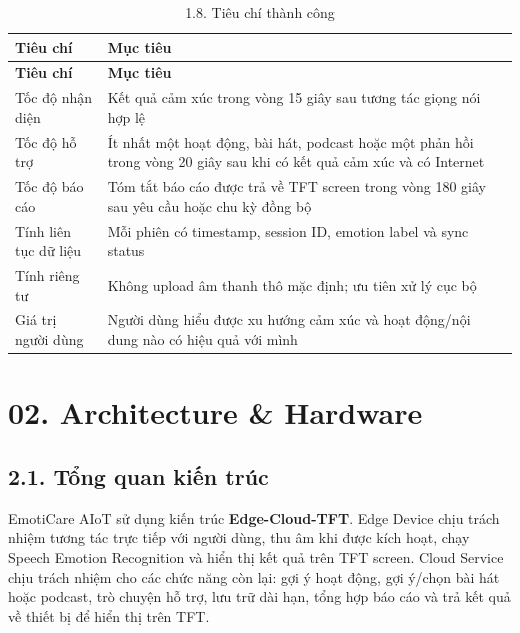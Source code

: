 \documentclass[12pt,a4paper]{article}
\begin{document}
\begin{center}
\begin{longtable}{|P{0.30\textwidth}|P{0.62\textwidth}|}
\caption{1.8. Tiêu chí thành công}\\
\hline
\textbf{Tiêu chí} & \textbf{Mục tiêu} \\
\hline
\endfirsthead
\hline
\textbf{Tiêu chí} & \textbf{Mục tiêu} \\
\hline
\endhead
Tốc độ nhận diện & Kết quả cảm xúc trong vòng 15 giây sau tương tác giọng nói hợp lệ \\
\hline
Tốc độ hỗ trợ & Ít nhất một hoạt động, bài hát, podcast hoặc một phản hồi trong vòng 20 giây sau khi có kết quả cảm xúc và có Internet \\
\hline
Tốc độ báo cáo & Tóm tắt báo cáo được trả về TFT screen trong vòng 180 giây sau yêu cầu hoặc chu kỳ đồng bộ \\
\hline
Tính liên tục dữ liệu & Mỗi phiên có timestamp, session ID, emotion label và sync status \\
\hline
Tính riêng tư & Không upload âm thanh thô mặc định; ưu tiên xử lý cục bộ \\
\hline
Giá trị người dùng & Người dùng hiểu được xu hướng cảm xúc và hoạt động/nội dung nào có hiệu quả với mình \\
\hline
\end{longtable}
\end{center}

\FloatBarrier

\clearpage
\section*{02. Architecture \& Hardware}

\subsection*{2.1. Tổng quan kiến trúc}

EmotiCare AIoT sử dụng kiến trúc \textbf{Edge-Cloud-TFT}. Edge Device chịu trách nhiệm tương tác trực tiếp với người dùng, thu âm khi được kích hoạt, chạy Speech Emotion Recognition và hiển thị kết quả trên TFT screen. Cloud Service chịu trách nhiệm cho các chức năng còn lại: gợi ý hoạt động, gợi ý/chọn bài hát hoặc podcast, trò chuyện hỗ trợ, lưu trữ dài hạn, tổng hợp báo cáo và trả kết quả về thiết bị để hiển thị trên TFT.
\end{document}
